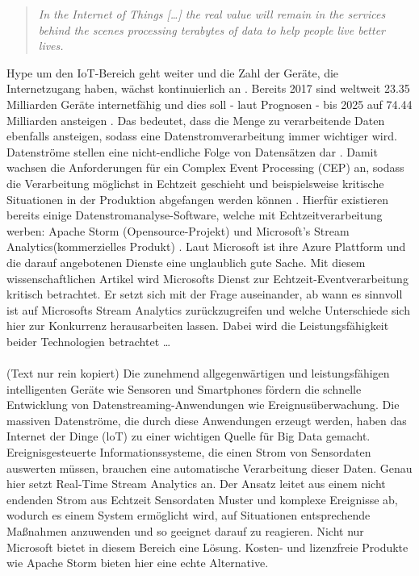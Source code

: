 
\begin{quote} \textit{\glqq In the Internet of Things […] the real value will remain in the services behind the scenes processing terabytes of data to help people live better lives. \grqq~}\cite{Floarea.2014}\\ \end{quote} 

 Hype um den IoT-Bereich geht weiter und die Zahl der Geräte, die Internetzugang haben, wächst kontinuierlich an \cite{peter.2015}. Bereits 2017 sind weltweit 23.35 Milliarden Geräte internetfähig und dies soll - laut Prognosen - bis 2025 auf 74.44 Milliarden ansteigen \cite{Statista.2017}. Das bedeutet, dass die Menge zu verarbeitende Daten ebenfalls ansteigen, sodass eine Datenstromverarbeitung immer wichtiger wird. Datenströme stellen eine nicht-endliche Folge von Datensätzen dar \cite{Mock.2005}. Damit wachsen die Anforderungen für ein Complex Event Processing (CEP) an, sodass die Verarbeitung möglichst in Echtzeit geschieht und beispielsweise kritische Situationen in der Produktion abgefangen werden können \cite{rcrwireless.2016}. Hierfür existieren  bereits einige Datenstromanalyse-Software, welche mit Echtzeitverarbeitung werben: Apache Storm (Opensource-Projekt) \cite{apache.2017} und Microsoft's Stream Analytics(kommerzielles Produkt) \cite{Microsoft.2017}. Laut Microsoft ist ihre Azure Plattform und die darauf angebotenen Dienste eine unglaublich gute Sache. Mit diesem wissenschaftlichen Artikel wird Microsofts Dienst zur Echtzeit-Eventverarbeitung kritisch betrachtet. Er setzt sich mit der Frage auseinander, ab wann es sinnvoll ist auf Microsofts Stream Analytics zurückzugreifen und welche Unterschiede sich hier zur Konkurrenz herausarbeiten lassen. Dabei wird die Leistungsfähigkeit beider Technologien betrachtet … \\ \\
(Text nur rein kopiert) Die zunehmend allgegenwärtigen und leistungsfähigen intelligenten Geräte wie Sensoren und Smartphones fördern die schnelle Entwicklung von Datenstreaming-Anwendungen wie Ereignusüberwachung. Die massiven Datenströme, die durch diese Anwendungen erzeugt werden, haben das Internet der Dinge (loT) zu einer wichtigen Quelle für Big Data gemacht. 
Ereignisgesteuerte Informationssysteme, die einen Strom von Sensordaten auswerten müssen, brauchen eine automatische Verarbeitung dieser Daten. Genau hier setzt Real-Time Stream Analytics an. Der Ansatz leitet aus einem nicht endenden Strom aus Echtzeit Sensordaten Muster und komplexe Ereignisse ab, wodurch es einem System ermöglicht wird, auf Situationen entsprechende Maßnahmen anzuwenden und so geeignet darauf zu reagieren. Nicht nur Microsoft bietet in diesem Bereich eine Lösung. Kosten- und lizenzfreie Produkte wie Apache Storm bieten hier eine echte Alternative. 
